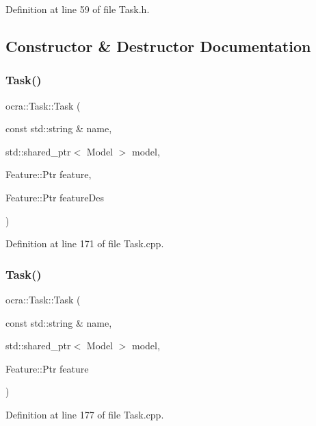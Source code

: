 Definition at line 59 of file Task.\+h.



\subsection{Constructor \& Destructor Documentation}
\hypertarget{classocra_1_1Task_abf071538753cbbc6af21f98644d978cc}{}\label{classocra_1_1Task_abf071538753cbbc6af21f98644d978cc} 
\subsubsection{\texorpdfstring{Task()}{Task()}\hspace{0.1cm}{\footnotesize\ttfamily [1/2]}}
{\footnotesize\ttfamily ocra\+::\+Task\+::\+Task (\begin{DoxyParamCaption}\item[{const std\+::string \&}]{name,  }\item[{std\+::shared\+\_\+ptr$<$ Model $>$}]{model,  }\item[{Feature\+::\+Ptr}]{feature,  }\item[{Feature\+::\+Ptr}]{feature\+Des }\end{DoxyParamCaption})}



Definition at line 171 of file Task.\+cpp.

\hypertarget{classocra_1_1Task_ace0cba5936451a6423e8f341746adfd3}{}\label{classocra_1_1Task_ace0cba5936451a6423e8f341746adfd3} 
\subsubsection{\texorpdfstring{Task()}{Task()}\hspace{0.1cm}{\footnotesize\ttfamily [2/2]}}
{\footnotesize\ttfamily ocra\+::\+Task\+::\+Task (\begin{DoxyParamCaption}\item[{const std\+::string \&}]{name,  }\item[{std\+::shared\+\_\+ptr$<$ Model $>$}]{model,  }\item[{Feature\+::\+Ptr}]{feature }\end{DoxyParamCaption})}



Definition at line 177 of file Task.\+cpp.

